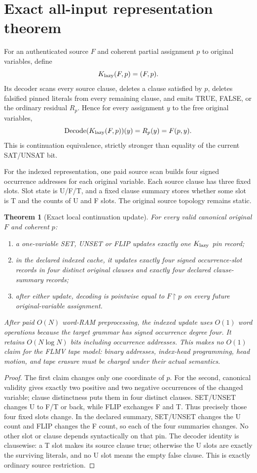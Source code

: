 \documentclass[11pt]{article}
\newtheorem{theorem}{Theorem}
\begin{document}
\section{Exact all-input representation theorem}
For an authenticated source $F$ and coherent partial assignment $p$ to original variables, define
\[
K_{\rm lazy}(F,p)=(F,p).
\]
Its decoder scans every source clause, deletes a clause satisfied by $p$, deletes falsified pinned literals from every remaining clause, and emits TRUE, FALSE, or the ordinary residual $R_p$. Hence for every assignment $y$ to the free original variables,
\[
\operatorname{Decode}(K_{\rm lazy}(F,p))(y)=R_p(y)=F(p,y).
\]
This is continuation equivalence, strictly stronger than equality of the current SAT/UNSAT bit.

For the indexed representation, one paid source scan builds four signed occurrence addresses for each original variable. Each source clause has three fixed slots. Slot state is U/F/T, and a fixed clause summary stores whether some slot is T and the counts of U and F slots. The original source topology remains static.

\begin{theorem}[Exact local continuation update]
For every valid canonical original $F$ and coherent $p$:
\begin{enumerate}
\item a one-variable SET, UNSET or FLIP updates exactly one $K_{\rm lazy}$ pin record;
\item in the declared indexed cache, it updates exactly four signed occurrence-slot records in four distinct original clauses and exactly four declared clause-summary records;
\item after either update, decoding is pointwise equal to $F\!\upharpoonright p$ on every future original-variable assignment.
\end{enumerate}
After paid $O(N)$ word-RAM preprocessing, the indexed update uses $O(1)$ word operations because the target grammar has signed occurrence degree four. It retains $O(N\log N)$ bits including occurrence addresses. This makes no $O(1)$ claim for the FLMV tape model: binary addresses, index-head programming, head motion, and tape erasure must be charged under their actual semantics.
\end{theorem}
\begin{proof}
The first claim changes only one coordinate of $p$. For the second, canonical validity gives exactly two positive and two negative occurrences of the changed variable; clause distinctness puts them in four distinct clauses. SET/UNSET changes U to F/T or back, while FLIP exchanges F and T. Thus precisely those four fixed slots change. In the declared summary, SET/UNSET changes the U count and FLIP changes the F count, so each of the four summaries changes. No other slot or clause depends syntactically on that pin. The decoder identity is clausewise: a T slot makes its source clause true; otherwise the U slots are exactly the surviving literals, and no U slot means the empty false clause. This is exactly ordinary source restriction.
\end{proof}
\end{document}
